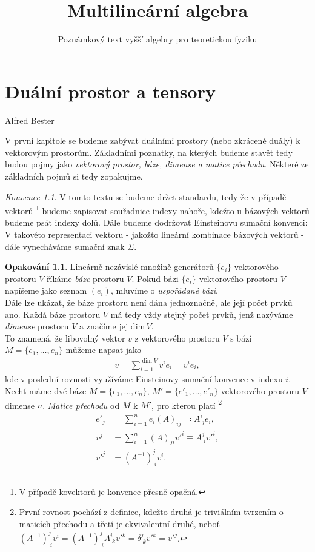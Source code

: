 \documentclass[a4paper,11pt]{report}
\title{Multilineární algebra}
\author{Poznámkový text vyšší algebry pro teoretickou fyziku}
\date{}
\theoremstyle{theorem}
\theoremstyle{remark}
\newtheorem*{convention}{Konvence}
\theoremstyle{definition}
\newtheorem*{recap}{Opakování}
\begin{document}
	
	\maketitle
	\newpage
	\tableofcontents
	\newpage
	
	\chapter{Duální prostor a tensory}
	\epigraph{
	}{Alfred Bester}
		
			
		V první kapitole se budeme zabývat duálními prostory (nebo zkráceně duály) k vektorovým prostorům. Základními poznatky, na kterých budeme stavět tedy budou pojmy jako \textit{vektorový prostor, báze, dimense a matice přechodu}. Některé ze základních pojmů si tedy zopakujme.
		\begin{convention}
			V tomto textu se budeme držet standardu, tedy že v případě vektorů%
				\footnote{V případě kovektorů je konvence přesně opačná.}
			budeme zapisovat souřadnice indexy nahoře, kdežto u bázových vektorů budeme psát indexy dolů. Dále budeme dodržovat Einsteinovu sumační konvenci: V takovéto representaci vektoru - jakožto lineární kombinace bázových vektorů - dále vynecháváme sumační znak $\Sigma$.
		\end{convention}
		\begin{recap}
			Lineárně nezávislé množině generátorů $\{e_i\}$ vektorového prostoru $V$ říkáme \textit{báze} prostoru $V$. Pokud bázi $\{e_i\}$ vektorového prostoru $V$ napíšeme jako seznam $(e_i)$, mluvíme o \textit{uspořádané bázi}.\\
			Dále lze ukázat, že báze prostoru není dána jednoznačně, ale její počet prvků ano. Každá báze prostoru $V$ má tedy vždy stejný počet prvků, jenž nazýváme \textit{dimense} prostoru $V$ a značíme jej $\mathrm{dim} \, V$.\\
			To znamená, že libovolný vektor $v$ z vektorového prostoru $V$ s bází $M=\{e_1, \dots, e_n\}$ můžeme napsat jako
			\begin{align*}
				v = \sum_{i=1}^{\dim V} v^i e_i = v^i e_i,
			\end{align*}
			kde v poslední rovnosti využíváme Einsteinovy sumační konvence v indexu $i$.\\
			Nechť máme dvě báze $M = \{e_1, \dots, e_n\}, \, M' = \{e'_1, \dots, e'_n\}$ vektorového prostoru $V$ dimense $n$. \textit{Matice přechodu} od $M$ k $M'$, pro kterou platí%
				\footnote{První rovnost pochází z definice, kdežto druhá je triviálním tvrzením o maticích přechodu a třetí je ekvivalentní druhé, neboť $(A^{-1})^j_{\; i} v^i = (A^{-1})^j_{\; i} A^i_{\; k} v'^k = \delta^j_{\; k} v'^k = v'^j$.}
			\begin{align*}
				e'_j &= \sum_{i=1}^{n} e_i (A)_{ij} \eqqcolon A^{i}_{\; j} e_i,
			\\
				v^j &= \sum_{i=1}^{n} (A)_{ji} v'^i \equiv A^j_{\; i} v'^i,
			\\
				v'^j &= (A^{-1})^j_{\; i} v^i.
			\end{align*}
		\end{recap}
		
\end{document}

